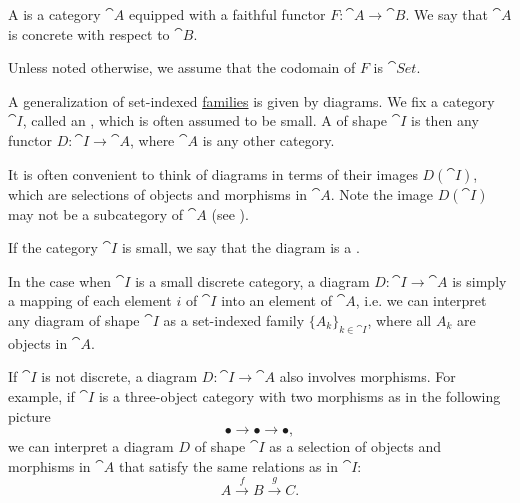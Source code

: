 \begin{definition}\label{def:concrete_category}
  A  is a category \( \cat{A} \) equipped with a faithful functor \( F: \cat{A} \to \cat{B} \). We say that \( \cat{A} \) is concrete with respect to \( \cat{B} \).

  Unless noted otherwise, we assume that the codomain of \( F \) is \( \cat{Set} \).
\end{definition}

\begin{definition}\label{def:categorical_diagram}
  A generalization of set-indexed \hyperref[def:indexed_family]{families} is given by diagrams. We fix a category \( \cat{I} \), called an , which is often assumed to be small. A  of shape \( \cat{I} \) is then any functor \( D: \cat{I} \to \cat{A} \), where \( \cat{A} \) is any other category.

  It is often convenient to think of diagrams in terms of their images \( D(\cat{I}) \), which are selections of objects and morphisms in \( \cat{A} \). Note the image \( D(\cat{I}) \) may not be a subcategory of \( \cat{A} \) (see ).

  If the category \( \cat{I} \) is small, we say that the diagram is a .
\end{definition}

\begin{example}\label{ex:categorical_diagrams}
  \hfill
  \begin{thmenum}
    \item In the case when \( \cat{I} \) is a small discrete category, a diagram \( D: \cat{I} \to \cat{A} \) is simply a mapping of each element \( i \) of \( \cat{I} \) into an element of \( \cat{A} \), i.e. we can interpret any diagram of shape \( \cat{I} \) as a set-indexed family \( \{ A_k \}_{k \in \cat{I}} \), where all \( A_k \) are objects in \( \cat{A} \).

    \item If \( \cat{I} \) is not discrete, a diagram \( D: \cat{I} \to \cat{A} \) also involves morphisms. For example, if \( \cat{I} \) is a three-object category with two morphisms as in the following picture
    \begin{equation*}
      \bullet \longrightarrow \bullet \longrightarrow \bullet,
    \end{equation*}
    we can interpret a diagram \( D \) of shape \( \cat{I} \) as a selection of objects and morphisms in \( \cat{A} \) that satisfy the same relations as in \( \cat{I} \):
    \begin{equation*}
      A
      \overset f \longrightarrow
      B
      \overset g \longrightarrow
      C.
    \end{equation*}
  \end{thmenum}
\end{example}

